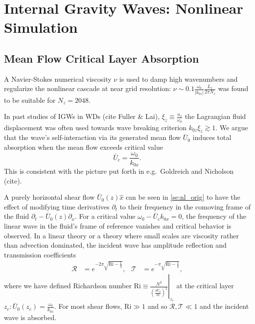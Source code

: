 \documentclass[
        fleqn,
        usenatbib,
    ]{mnras}
\newcommand*{\pd}[2]{\frac{\partial#1}{\partial#2}}
\newcommand*{\at}[1]{\left.#1\right|}
\newcommand*{\abs}[1]{\left|#1\right|}
\newcommand*{\p}[1]{\left(#1\right)}
\begin{document}
\section{Internal Gravity Waves: Nonlinear Simulation}\label{s:sim}

\subsection{Mean Flow Critical Layer Absorption}

A Navier-Stokes numerical viscosity $\nu$ is used to damp high wavenumbers and
regularize the nonlinear cascade at near grid resolution: $\nu \sim 0.1
\frac{\omega_0}{\abs{k_{0z}}}\frac{L_z}{2\pi N_z}$ was found to be suitable for
$N_z = 2048$.

In past studies of IGWs in WDs (cite Fuller \& Lai), $\xi_z \equiv
\frac{u_z}{\omega_0}$ the Lagrangian fluid displacement was often used towards
wave breaking criterion $k_{0z}\xi_z \gtrsim 1$. We argue that the wave's
self-interaction via its generated mean flow $\bar{U}_0$ induces total
absorption when the mean flow exceeds critical value
\begin{equation}
    \bar{U}_c = \frac{\omega_0}{k_{0x}}.
\end{equation}
This is consistent with the picture put forth in e.g.\ Goldreich and Nicholson
(cite).

A purely horizontal shear flow $\bar{U}_0(z) \hat{x}$ can be seen in
\autoref{se:nl_orig} to have the effect of modifying time derivatives
$\partial_t$ to their frequency in the comoving frame of the fluid $\partial_t -
\bar{U}_0(z)\partial_x$. For a critical value $\omega_0 - \bar{U}_c k_{0x} = 0$,
the frequency of the linear wave in the fluid's frame of reference vanishes and
critical behavior is observed. In a linear theory or a theory where small scales
are viscosity rather than advection dominated, the incident wave has amplitude
reflection and transmission coefficients
\begin{align}
    \mathcal{R} &= e^{-2\pi \sqrt{\mathrm{Ri} - \frac{1}{4}}}, &
    \mathcal{T} &= e^{-\pi \sqrt{\mathrm{Ri} - \frac{1}{4}}},
    \label{eq:crit_coeffs}
\end{align}
where we have defined Richardson number $\mathrm{Ri} \equiv
\at{\frac{N^2}{\p{\pd{\bar{U}_0}{z}}^2}}_{z_c}$ at the critical layer $z_c:
\bar{U}_0(z_c) = \frac{\omega_0}{k_{0x}}$. For most shear flows, $\mathrm{Ri}
\gg 1$ and so $\mathcal{R}, \mathcal{T} \ll 1$ and the incident wave is
absorbed.
\end{document}
